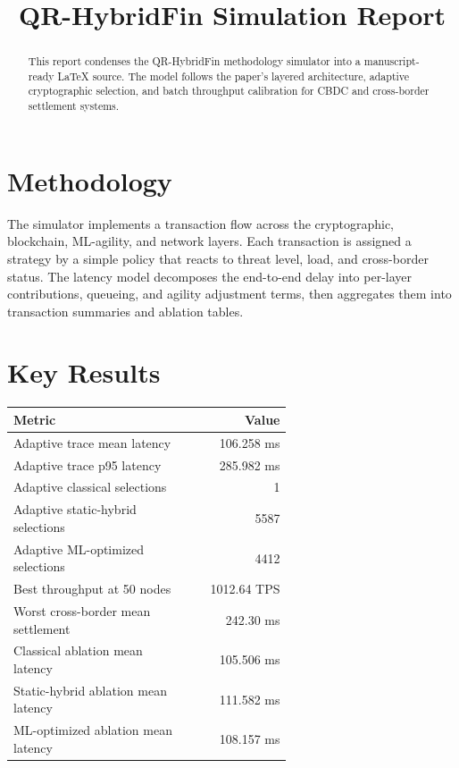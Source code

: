 \documentclass[11pt]{article}
\title{QR-HybridFin Simulation Report}
\author{}
\date{}
\begin{document}
\maketitle
\begin{abstract}
This report condenses the QR-HybridFin methodology simulator into a manuscript-ready LaTeX source. The model follows the paper's layered architecture, adaptive cryptographic selection, and batch throughput calibration for CBDC and cross-border settlement systems.
\end{abstract}
\section*{Methodology}
The simulator implements a transaction flow across the cryptographic, blockchain, ML-agility, and network layers. Each transaction is assigned a strategy by a simple policy that reacts to threat level, load, and cross-border status. The latency model decomposes the end-to-end delay into per-layer contributions, queueing, and agility adjustment terms, then aggregates them into transaction summaries and ablation tables.
\section*{Key Results}
\begin{table}[h]
\centering
\begin{tabular}{@{}p{0.62\linewidth}r@{}}
\toprule
Metric & Value \\
\midrule
Adaptive trace mean latency & 106.258 ms \\
Adaptive trace p95 latency & 285.982 ms \\
Adaptive classical selections & 1 \\
Adaptive static-hybrid selections & 5587 \\
Adaptive ML-optimized selections & 4412 \\
Best throughput at 50 nodes & 1012.64 TPS \\
Worst cross-border mean settlement & 242.30 ms \\
Classical ablation mean latency & 105.506 ms \\
Static-hybrid ablation mean latency & 111.582 ms \\
ML-optimized ablation mean latency & 108.157 ms \\
\bottomrule
\end{tabular}
\end{table}
\end{document}
